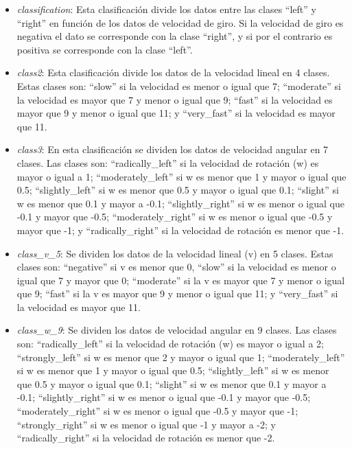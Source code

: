 \begin{itemize}
    \item \textit{classification}: Esta clasificación divide los datos entre las clases ``left'' y ``right'' en función de los datos de velocidad de giro. Si la velocidad de giro es negativa el dato se corresponde con la clase ``right'', y si por el contrario es positiva se corresponde con la clase ``left''.
    
    \item \textit{class2}: Esta clasificación divide los datos de la velocidad lineal en 4 clases. Estas clases son: ``slow'' si la velocidad es menor o igual que 7; ``moderate'' si la velocidad es mayor que 7 y menor o igual que 9; ``fast'' si la velocidad es mayor que 9 y menor o igual que 11; y ``very\_fast'' si la velocidad es mayor que 11.
    
    \item \textit{class3}: En esta clasificación se dividen los datos de velocidad angular en 7 clases. Las clases son: ``radically\_left'' si la velocidad de rotación (w) es mayor o igual a 1; ``moderately\_left'' si w es menor que 1 y mayor o igual que 0.5; ``slightly\_left'' si w es menor que 0.5 y mayor o igual que 0.1; ``slight'' si w es menor que 0.1 y mayor a -0.1; ``slightly\_right'' si w es menor o igual que -0.1 y mayor que -0.5; ``moderately\_right''  si w es menor o igual que -0.5 y mayor que -1; y ``radically\_right'' si la velocidad de rotación es menor que -1.
    
    \item \textit{class\_v\_5}: Se dividen los datos de la velocidad lineal (v) en 5 clases. Estas clases son: ``negative'' si v es menor que 0, ``slow'' si la velocidad es menor o igual que 7 y mayor que 0; ``moderate'' si la v es mayor que 7 y menor o igual que 9; ``fast'' si la v es mayor que 9 y menor o igual que 11; y ``very\_fast'' si la velocidad es mayor que 11.
    
    \item \textit{class\_w\_9}: Se dividen los datos de velocidad angular en 9 clases. Las clases son: ``radically\_left'' si la velocidad de rotación (w) es mayor o igual a 2; ``strongly\_left'' si w es menor que 2 y mayor o igual que 1; ``moderately\_left'' si w es menor que 1 y mayor o igual que 0.5; ``slightly\_left'' si w es menor que 0.5 y mayor o igual que 0.1; ``slight'' si w es menor que 0.1 y mayor a -0.1; ``slightly\_right'' si w es menor o igual que -0.1 y mayor que -0.5; ``moderately\_right''  si w es menor o igual que -0.5 y mayor que -1; ``strongly\_right'' si w es menor o igual que -1 y mayor a -2; y ``radically\_right'' si la velocidad de rotación es menor que -2.
\end{itemize}

